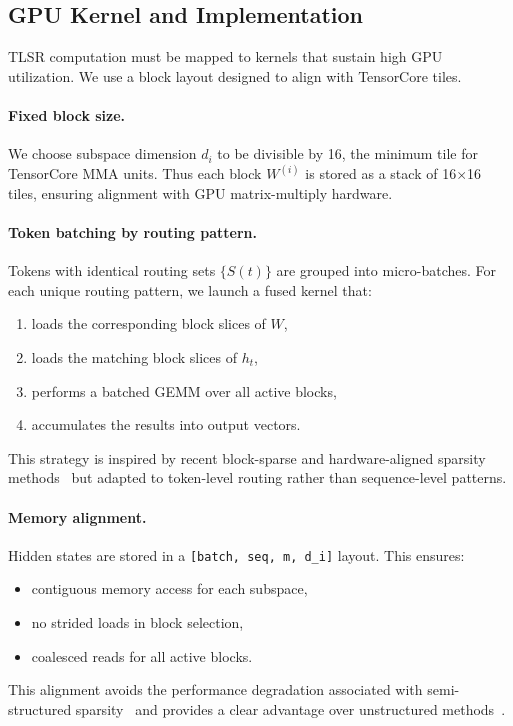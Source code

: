 \documentclass{article}
\theoremstyle{plain}
\theoremstyle{definition}
\theoremstyle{remark}
\begin{document}
\subsection{GPU Kernel and Implementation}

TLSR computation must be mapped to kernels that sustain high GPU utilization.
We use a block layout designed to align with TensorCore tiles.

\paragraph{Fixed block size.}
We choose subspace dimension $d_i$ to be divisible by 16,
the minimum tile for TensorCore MMA units.
Thus each block $W^{(i)}$ is stored as a stack of 16$\times$16 tiles,
ensuring alignment with GPU matrix-multiply hardware.

\paragraph{Token batching by routing pattern.}
Tokens with identical routing sets $\{S(t)\}$ are grouped into micro-batches.
For each unique routing pattern, we launch a fused kernel that:
\begin{enumerate}
\item loads the corresponding block slices of $W$,
\item loads the matching block slices of $h_t$,
\item performs a batched GEMM over all active blocks,
\item accumulates the results into output vectors.
\end{enumerate}

This strategy is inspired by recent block-sparse and hardware-aligned sparsity
methods~\cite{xiao2025dbsa,li2025hilbertlocal,xu2025xattention}
but adapted to token-level routing rather than sequence-level patterns.

\paragraph{Memory alignment.}
Hidden states are stored in a \texttt{[batch, seq, m, d\_i]} layout.
This ensures:
\begin{itemize}
\item contiguous memory access for each subspace,
\item no strided loads in block selection,
\item coalesced reads for all active blocks.
\end{itemize}
This alignment avoids the performance degradation associated with
semi-structured sparsity~\cite{fang2024maskllm}
and provides a clear advantage over unstructured methods~\cite{sun2023simplepruning}.
\end{document}
